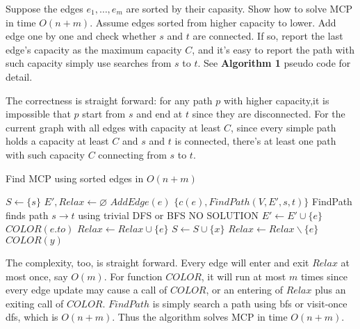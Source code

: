 \documentclass[11pt,a4paper,oneside]{article}
\begin{document}
\begin{problem}{1}
	\statement
	Suppose the edges $e_1,\dots,e_m$ are sorted by their capasity. Show how to solve MCP in time $O(n+m)$.
	\solution
	Assume edges sorted from higher capacity to lower. Add edge one by one and check whether \(s\) and \(t\) are connected. If so, report the last edge's capacity as the maximum capacity $C$, and it's easy to report the path with such capacity simply use searches from $s$ to $t$. See \textbf{Algorithm 1} pseudo code for detail.

	The correctness is straight forward: for any path $p$ with higher capacity,it is impossible that $p$ start from $s$ and end at $t$ since they are disconnected. For the current graph with all edges with capacity at least $C$, since every simple path holds a capacity at least $C$ and $s$ and $t$ is connected, there's at least one path with such capacity $C$ connecting from $s$ to $t$.

	\begin{algorithm}
		\caption{Find MCP using sorted edges in $O(n + m)$}
		\begin{algorithmic}[1]
			\State $S \leftarrow \{ s \}$
			\State $E',Relax \leftarrow \varnothing$
				\State $AddEdge(e)$
					\State \Return $\{c(e), FindPath(V, E', s, t)\}$
					\Comment FindPath finds path $s \rightarrow t$ using trivial DFS or BFS
				\EndIf
			\EndFor
			\State \Return NO SOLUTION
			\EndFunction
				\State $E' \leftarrow E' \cup \{e\}$
					\State $COLOR(e.to)$
				\Else
					\State $Relax \leftarrow Relax \cup \{e\}$
				\EndIf
			\EndFunction
				\State $S \leftarrow S \cup \{ x \}$
				\State $Relax \leftarrow Relax \backslash \{e\}$
				\State $COLOR(y)$
				\EndFor
			\EndFunction
		\end{algorithmic}
	\end{algorithm}
	
	The complexity, too, is straight forward. Every edge will enter and exit $Relax$ at most once, say $O(m)$. For function $COLOR$, it will run at most $m$ times since every edge update may cause a call of $COLOR$, or an entering of $Relax$ plus an exiting call of $COLOR$. $FindPath$ is simply search a path using bfs or visit-once dfs, which is $O(n + m)$. Thus the algorithm solves MCP in time \(O(n + m)\).
\end{problem}
\end{document}
